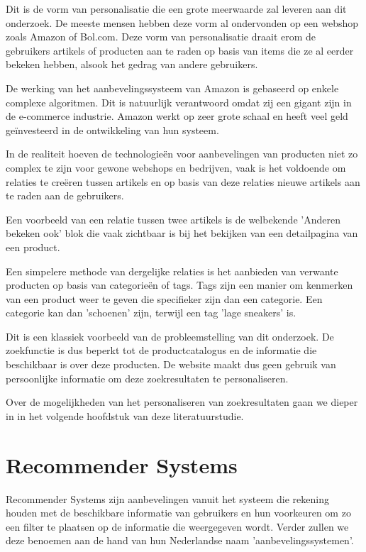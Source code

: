  Dit is de vorm van personalisatie die een grote meerwaarde zal leveren aan dit onderzoek. De meeste mensen hebben deze vorm al ondervonden op een webshop zoals Amazon of Bol.com. Deze vorm van personalisatie draait erom de gebruikers artikels of producten aan te raden op basis van items die ze al eerder bekeken hebben, alsook het gedrag van andere gebruikers.
 
De werking van het aanbevelingssysteem van Amazon is gebaseerd op enkele complexe algoritmen. \autocite{Linden2003} Dit is natuurlijk verantwoord omdat zij een gigant zijn in de e-commerce industrie. Amazon werkt op zeer grote schaal en heeft veel geld geïnvesteerd in de ontwikkeling van hun systeem. 

\newpage
In de realiteit hoeven de technologieën voor aanbevelingen van producten niet zo complex te zijn voor gewone webshops en bedrijven, vaak is het voldoende om relaties te creëren tussen artikels en op basis van deze relaties nieuwe artikels aan te raden aan de gebruikers. 

Een voorbeeld van een relatie tussen twee artikels is de welbekende 'Anderen bekeken ook' blok die vaak zichtbaar is bij het bekijken van een detailpagina van een product. 

Een simpelere methode van dergelijke relaties is het aanbieden van verwante producten op basis van categorieën of tags. Tags zijn een manier om kenmerken van een product weer te geven die specifieker zijn dan een categorie. Een categorie kan dan 'schoenen' zijn, terwijl een tag 'lage sneakers' is. 

Dit is een klassiek voorbeeld van de probleemstelling van dit onderzoek. De zoekfunctie is dus beperkt tot de productcatalogus en de informatie die beschikbaar is over deze producten. De website maakt dus geen gebruik van persoonlijke informatie om deze zoekresultaten te personaliseren.

Over de mogelijkheden van het personaliseren van zoekresultaten gaan we dieper in in het volgende hoofdstuk van deze literatuurstudie.

\section{Recommender Systems}
\label{sec:Recommender Systems}
Recommender Systems \autocite{Resnick1997} zijn aanbevelingen vanuit het systeem die rekening houden met de beschikbare informatie van gebruikers en hun voorkeuren om zo een filter te plaatsen op de informatie die weergegeven wordt. Verder zullen we deze benoemen aan de hand  van hun Nederlandse naam 'aanbevelingssystemen'.

